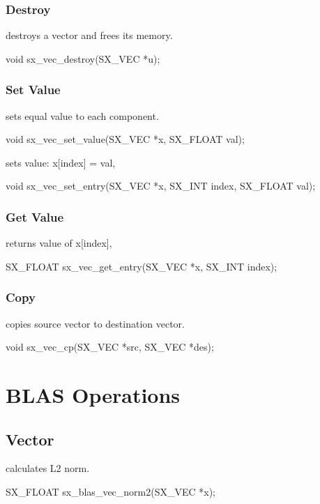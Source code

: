 \subsubsection{Destroy}

 destroys a vector and frees its memory.
\begin{evb}
void sx_vec_destroy(SX_VEC *u);
\end{evb}

\subsubsection{Set Value}

 sets equal value to each component.
\begin{evb}
void sx_vec_set_value(SX_VEC *x, SX_FLOAT val);
\end{evb}

 sets value: x[index] = val,
\begin{evb}
void sx_vec_set_entry(SX_VEC *x, SX_INT index, SX_FLOAT val);
\end{evb}

\subsubsection{Get Value}
 returns value of x[index],
\begin{evb}
SX_FLOAT sx_vec_get_entry(SX_VEC *x, SX_INT index);
\end{evb}

\subsubsection{Copy}
 copies source vector to destination vector.
\begin{evb}
void sx_vec_cp(SX_VEC *src, SX_VEC *des);
\end{evb}

\section{BLAS Operations}

\subsection{Vector}
 calculates L2 norm.
\begin{evb}
SX_FLOAT sx_blas_vec_norm2(SX_VEC *x);
\end{evb}

